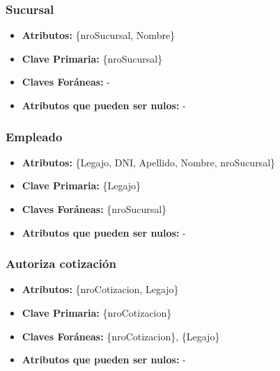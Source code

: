 \documentclass[a4paper,11pt]{article}
\begin{document}
\subsubsection{Sucursal}

\begin{itemize}

	\item \textbf{Atributos:} \{nroSucursal, Nombre\}
	
	\item \textbf{Clave Primaria:} \{nroSucursal\}
	
	\item \textbf{Claves Foráneas:} -

	\item \textbf{Atributos que pueden ser nulos:} -
	
\end{itemize}

\subsubsection{Empleado}

\begin{itemize}

	\item \textbf{Atributos:} \{Legajo, DNI, Apellido, Nombre, nroSucursal\}
	
	\item \textbf{Clave Primaria:} \{Legajo\}
	
	\item \textbf{Claves Foráneas:} \{nroSucursal\}

	\item \textbf{Atributos que pueden ser nulos:} -
	
\end{itemize}

\subsubsection{Autoriza cotización}

\begin{itemize}

	\item \textbf{Atributos:} \{nroCotizacion, Legajo\}
	
	\item \textbf{Clave Primaria:} \{nroCotizacion\}
	
	\item \textbf{Claves Foráneas:} \{nroCotizacion\}, \{Legajo\}
	
	\item \textbf{Atributos que pueden ser nulos:} -
	
\end{itemize}
\end{document}
